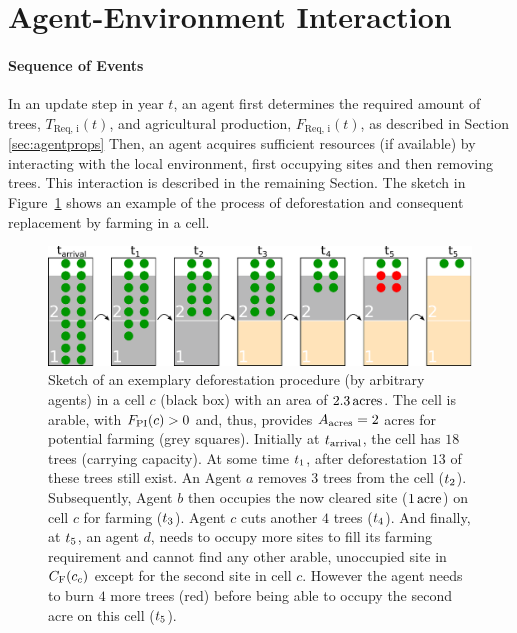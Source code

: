 \FloatBarrier
\section{Agent-Environment Interaction} \label{sec:Harvest}
\paragraph{Sequence of Events}
In an update step in year $t$, an agent first determines the required amount of trees, $T_\text{Req, i}(t)$, and agricultural production, $F_\text{Req, i}(t)$, as described in Section \ref{sec:agentprops}
Then, an agent acquires sufficient resources (if available) by interacting with the local environment, first occupying sites and then removing trees.
This interaction is described in the remaining Section.
The sketch in Figure~\ref{fig:treeburning} shows an example of the process of deforestation and consequent replacement by farming in a cell.
\begin{figure}
	\centering
	\includegraphics[width=\textwidth]{images/SketchABM2/burningSketch.pdf}
	\caption{Sketch of an exemplary deforestation procedure (by arbitrary agents) in a cell $c$ (black box) with an area of $2.3\, \rm{acres}$.
		The cell is arable, with $F_{\rm PI}(c)>0$ and, thus, provides $A_{\rm acres}=2$ acres for potential farming (grey squares).
		Initially at $t_{\rm arrival}$, the cell has $18$ trees (carrying capacity).
		At some time $t_{\rm 1}$, after deforestation $13$ of these trees still exist. 
		An Agent $a$ removes $3$ trees from the cell (\ra $t_{\rm 2}$). 
		Subsequently, Agent $b$ then occupies the now cleared site ($1\, {\rm acre}$) on cell $c$ for farming (\ra $t_{\rm 3}$). 
		Agent $c$ cuts another $4$ trees (\ra $t_{\rm 4}$).
		And finally, at $t_{\rm 5}$, an agent $d$, needs to occupy more sites to fill its farming requirement and cannot find any other arable, unoccupied site in $C_{\rm F}(c_c)$ except for the second site in cell $c$. 
		However the agent needs to burn $4$ more trees (red) before being able to occupy the second acre on this cell (\ra $t_{\rm 5}$).}
	\label{fig:treeburning}
\end{figure}

